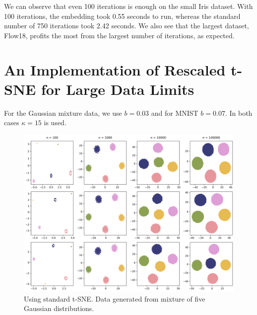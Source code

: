 We can observe that even 100 iterations is enough on the small Iris dataset. 
With 100 iterations, the embedding took 0.55 seconds to run, whereas the standard number of 750 iterations took 2.42 seconds. 
We also see that the largest dataset, Flow18, profits the most from the largest number of iterations, as expected. 

\newpage 
\section{An Implementation of Rescaled t-SNE for Large Data Limits}
For the Gaussian mixture data, we use $b=0.03$ and for MNIST $b=0.07$. In both cases $\kappa=15$ is used. 

\begin{figure}[h]
    \centering 
        \includegraphics[width=\linewidth]{figures/rescaled/Gaussian_Mixture_standard_embedding_grid.png}
        \caption{Using standard t-SNE. Data generated from mixture of five Gaussian distributions.}
    \label{fig:Gaussian-standard}
\end{figure}


